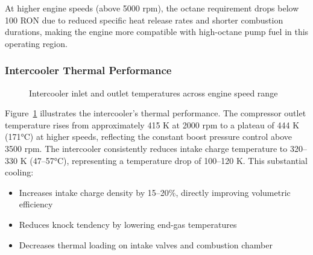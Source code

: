 At higher engine speeds (above 5000 rpm), the octane requirement drops below 100 RON due to reduced specific heat release rates and shorter combustion durations, making the engine more compatible with high-octane pump fuel in this operating region.

\subsubsection{Intercooler Thermal Performance}

\begin{figure}[H]
  \centering
  \caption{Intercooler inlet and outlet temperatures across engine speed range}
  \label{fig:task3_intercooler_temps}
\end{figure}

Figure~\ref{fig:task3_intercooler_temps} illustrates the intercooler's thermal performance. The compressor outlet temperature rises from approximately 415 K at 2000 rpm to a plateau of 444 K (171°C) at higher speeds, reflecting the constant boost pressure control above 3500 rpm. The intercooler consistently reduces intake charge temperature to 320--330 K (47--57°C), representing a temperature drop of 100--120 K. This substantial cooling:
\begin{itemize}
    \item Increases intake charge density by 15--20\%, directly improving volumetric efficiency
    \item Reduces knock tendency by lowering end-gas temperatures
    \item Decreases thermal loading on intake valves and combustion chamber
\end{itemize}

